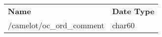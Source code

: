\begin{tabu}{p{0.5\textwidth}p{0.45\textwidth }}
\rowfont{\bfseries\leavevmode\color{headingfont}}\textbf{Name} & \textbf{Date Type} \\
/camelot/oc\_ord\_comment & char60 \\
\end{tabu}
